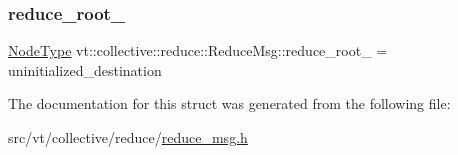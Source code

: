 \mbox{\label{structvt_1_1collective_1_1reduce_1_1_reduce_msg_a976e38c6642d09d5f171aab8216df6b0}} 
\subsubsection{\texorpdfstring{reduce\+\_\+root\+\_\+}{reduce\_root\_}}
{\footnotesize\ttfamily \hyperlink{namespacevt_a866da9d0efc19c0a1ce79e9e492f47e2}{Node\+Type} vt\+::collective\+::reduce\+::\+Reduce\+Msg\+::reduce\+\_\+root\+\_\+ = uninitialized\+\_\+destination}



The documentation for this struct was generated from the following file\+:\begin{DoxyCompactItemize}
\item 
src/vt/collective/reduce/\hyperlink{reduce__msg_8h}{reduce\+\_\+msg.\+h}\end{DoxyCompactItemize}

